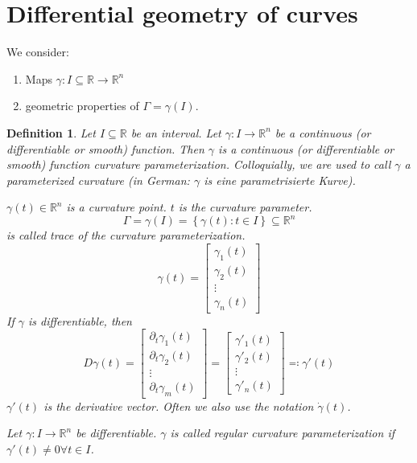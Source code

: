 \documentclass{article}
\newtheorem{definition}{Definition}  \numberwithin{definition}{section}
\newcommand{\set}[1]{\left\{#1\right\}}
\begin{document}
\section{Differential geometry of curves}

We consider:
\begin{enumerate}
  \item Maps $\gamma: I \subseteq \mathbb R \to \mathbb R^n$
  \item geometric properties of $\Gamma = \gamma(I)$.
\end{enumerate}

\begin{definition} %
  Let $I \subseteq \mathbb R$ be an interval.
  Let $\gamma: I \to \mathbb R^n$ be a continuous (or differentiable or smooth) function.
  Then $\gamma$ is a continuous (or differentiable or smooth) function curvature parameterization.
  Colloquially, we are used to call $\gamma$ a \emph{parameterized curvature} (in German: \foreignlanguage{german}{$\gamma$ is eine parametrisierte Kurve}).

  $\gamma(t) \in \mathbb R^n$ is a curvature point.
  $t$ is the curvature parameter.
  \[ \Gamma = \gamma(I) = \set{\gamma(t): t \in I} \subseteq \mathbb R^n \]
  is called trace of the curvature parameterization.
  \[ \gamma(t) = \begin{bmatrix} \gamma_1(t) \\ \gamma_2(t) \\ \vdots \\ \gamma_n(t) \end{bmatrix} \]
  If $\gamma$ is differentiable, then
  \[ D\gamma(t)
        = \begin{bmatrix} \partial_t \gamma_1(t) \\ \partial_t \gamma_2(t) \\ \vdots \\ \partial_t \gamma_m(t) \end{bmatrix}
        = \begin{bmatrix} \gamma'_1(t) \\ \gamma'_2(t) \\ \vdots \\ \gamma'_n(t) \end{bmatrix} \eqqcolon \gamma'(t)
  \]
  $\gamma'(t)$ is the derivative vector. Often we also use the notation $\dot{\gamma}(t)$.

  Let $\gamma: I \to \mathbb R^n$ be differentiable.
  $\gamma$ is called \emph{regular curvature parameterization} if $\gamma'(t) \neq 0 \forall t \in I$.
\end{definition}
\end{document}
